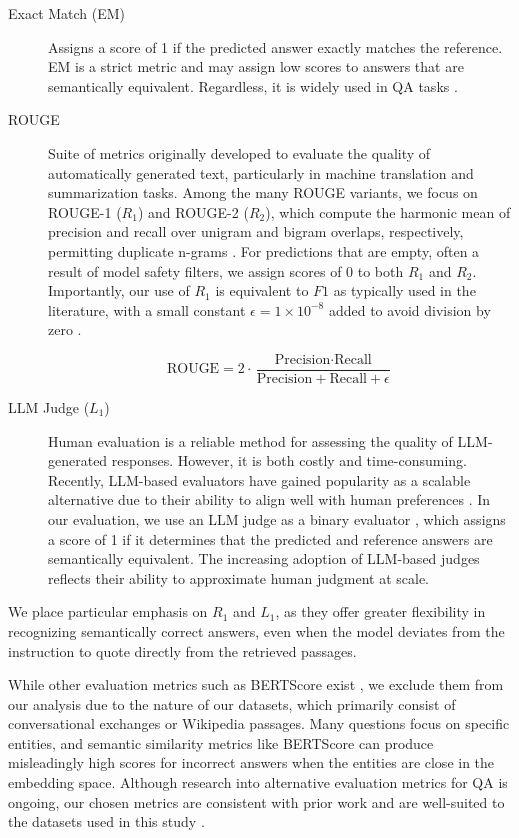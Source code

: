 \begin{description}
    \item[Exact Match (EM)] Assigns a score of 1 if the predicted answer exactly matches the reference. EM is a strict metric and may assign low scores to answers that are semantically equivalent. Regardless, it is widely used in QA tasks \cite{tang-etal-2021-multi}.
    \item[ROUGE] Suite of metrics originally developed to evaluate the quality of automatically generated text, particularly in machine translation and summarization tasks. Among the many ROUGE variants, we focus on ROUGE-1 ($R_1$) and ROUGE-2 ($R_2$), which compute the harmonic mean of precision and recall over unigram and bigram overlaps, respectively, permitting duplicate n-grams \cite{lin-2004-rouge}. For predictions that are empty, often a result of model safety filters, we assign scores of 0 to both $R_1$ and $R_2$. Importantly, our use of $R_1$ is equivalent to $F1$ as typically used in the literature, with a small constant $\epsilon=1 \times 10^{-8}$ added to avoid division by zero \cite{mrqa-2021-machine}.
    \par
    \begin{equation}
        \text{ROUGE} = 2 \cdot \frac{\text{Precision} \cdot \text{Recall}}{\text{Precision} + \text{Recall} + \epsilon}
    \end{equation}
    \item[LLM Judge ($L_1$)] Human evaluation is a reliable method for assessing the quality of LLM-generated responses. However, it is both costly and time-consuming. Recently, LLM-based evaluators have gained popularity as a scalable alternative due to their ability to align well with human preferences \cite{zheng2023judgingllmasajudgemtbenchchatbot}. In our evaluation, we use an LLM judge as a binary evaluator \cite{li2024llmsasjudgescomprehensivesurveyllmbased}, which assigns a score of 1 if it determines that the predicted and reference answers are semantically equivalent. The increasing adoption of LLM-based judges reflects their ability to approximate human judgment at scale.
\end{description}

\noindent We place particular emphasis on $R_1$ and $L_1$, as they offer greater flexibility in recognizing semantically correct answers, even when the model deviates from the instruction to quote directly from the retrieved passages.

\noindent While other evaluation metrics such as BERTScore exist \cite{zhang2020bertscoreevaluatingtextgeneration}, we exclude them from our analysis due to the nature of our datasets, which primarily consist of conversational exchanges or Wikipedia passages. Many questions focus on specific entities, and semantic similarity metrics like BERTScore can produce misleadingly high scores for incorrect answers when the entities are close in the embedding space. Although research into alternative evaluation metrics for QA is ongoing, our chosen metrics are consistent with prior work and are well-suited to the datasets used in this study \cite{chen-etal-2019-evaluating}.
